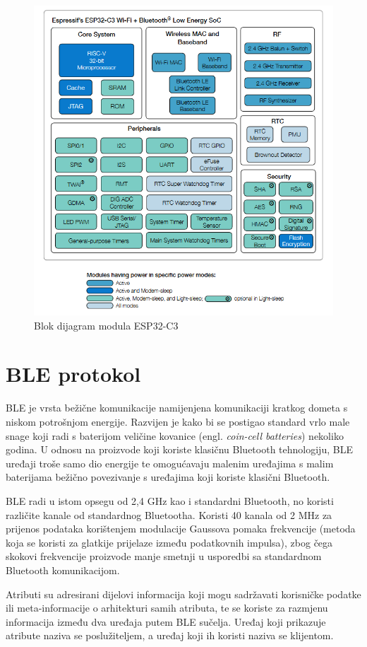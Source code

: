 \begin{figure}[ht]
	\centering
	\includegraphics[scale=0.6]{imgs/esp32block}
	\caption{Blok dijagram modula ESP32-C3 \cite{esp32manual}}
	\label{fig:esp32block}
\end{figure}

\section{BLE protokol}

BLE je vrsta bežične komunikacije namijenjena komunikaciji kratkog dometa s niskom potrošnjom energije. Razvijen je kako bi se postigao standard vrlo male snage koji radi s baterijom veličine kovanice (engl. \textit{coin-cell batteries}) nekoliko godina. U odnosu na proizvode koji koriste klasičnu Bluetooth tehnologiju, BLE uređaji troše samo dio energije te omogućavaju malenim uređajima s malim baterijama bežično povezivanje s uređajima koji koriste klasični Bluetooth. \cite{blevsbluetooth}

BLE radi u istom opsegu od 2,4 GHz kao i standardni Bluetooth, no koristi različite kanale od standardnog Bluetootha. Koristi 40 kanala od 2 MHz za prijenos podataka korištenjem modulacije Gaussova pomaka frekvencije (metoda koja se koristi za glatkije prijelaze između podatkovnih impulsa), zbog čega skokovi frekvencije proizvode manje smetnji u usporedbi sa standardnom Bluetooth komunikacijom.

Atributi su adresirani dijelovi informacija koji mogu sadržavati korisničke podatke ili meta-informacije o arhitekturi samih atributa, te se koriste za razmjenu informacija između dva uređaja putem BLE sučelja. Uređaj koji prikazuje atribute naziva se poslužiteljem, a uređaj koji ih koristi naziva se klijentom. 

\eject